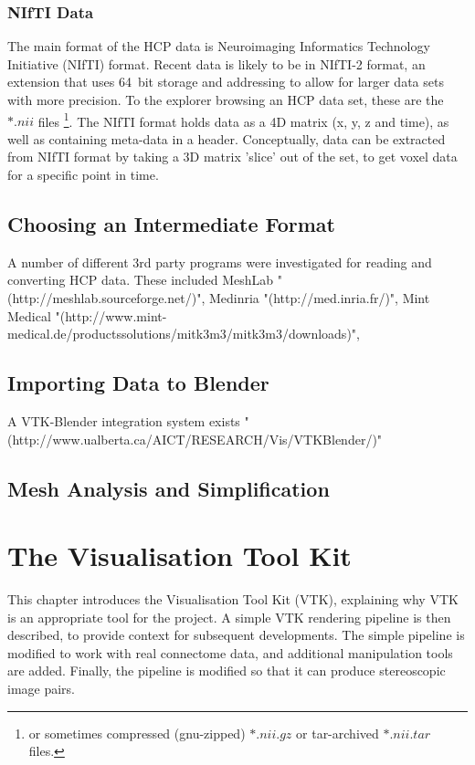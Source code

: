\documentclass[MSc,paper=a4,pagesize=auto]{icldt}
\begin{document}
\subsection{NIfTI Data}
The main format of the HCP data is Neuroimaging Informatics Technology Initiative (NIfTI) format. Recent data is likely to be in NIfTI-2 format, an extension that uses \SI{64}{bit} storage and addressing to allow for larger data sets with more precision. To the explorer browsing an HCP data set, these are the $\ast.nii$ files \footnote{or sometimes compressed (gnu-zipped) $\ast.nii.gz$ or tar-archived $\ast.nii.tar$ files.}. The NIfTI format holds data as a 4D matrix (x, y, z and time), as well as containing meta-data in a header. Conceptually, data can be extracted from NIfTI format by taking a 3D matrix 'slice' out of the set, to get voxel data for a specific point in time. 

\section{Choosing an Intermediate Format}
A number of different 3rd party programs were investigated for reading and converting HCP data. These included MeshLab "(http://meshlab.sourceforge.net/)", Medinria "(http://med.inria.fr/)", Mint Medical "(http://www.mint-medical.de/productssolutions/mitk3m3/mitk3m3/downloads)", 


\section{Importing Data to Blender}
A VTK-Blender integration system exists "(http://www.ualberta.ca/AICT/RESEARCH/Vis/VTKBlender/)" 

\section{Mesh Analysis and Simplification}

\chapter{The Visualisation Tool Kit}
This chapter introduces the Visualisation Tool Kit (VTK), explaining why VTK is an appropriate tool for the project. A simple VTK rendering pipeline is then described, to provide context for subsequent developments. The simple pipeline is modified to work with real connectome data, and additional manipulation tools are added. Finally, the pipeline is modified so that it can produce stereoscopic image pairs.
\end{document}
